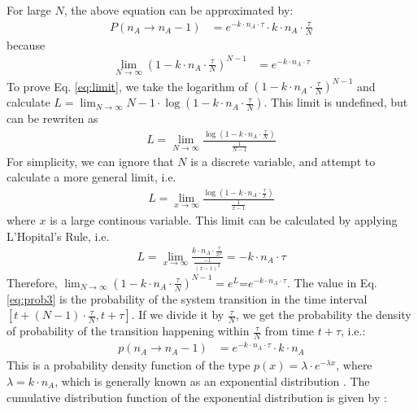 \documentclass[12pt]{article}
\begin{document}
For large $N$, the above equation can be approximated by:
\begin{align}
P(n_A \rightarrow n_A-1) &= e^{-k \cdot n_A \cdot \tau} \cdot k \cdot n_A \cdot \frac \tau N
\label{eq:prob3}
\end{align}
because 
\begin{align}
\lim_{N \to \infty} (1-k \cdot n_A \cdot \frac {\tau} {N})^{N-1} &= e^{-k \cdot n_A \cdot \tau}
\label{eq:limit}
\end{align}
To prove Eq. \ref{eq:limit}, we take the logarithm of $(1-k \cdot n_A \cdot \frac {\tau} {N})^{N-1}$ and calculate $L=\lim_{N \to \infty} {N-1} \cdot \log (1-k \cdot n_A \cdot \frac {\tau} {N})$. This limit is undefined, but can be rewriten as 
\begin {align}
L=\lim_{N \to \infty} \frac {\log (1-k \cdot n_A \cdot \frac {\tau} {N})} {\frac 1 {N-1}}
\end{align}
For simplicity, we can ignore that $N$ is a discrete variable, and attempt to calculate a more general limit, i.e. 
\begin {align}
L=\lim_{x \to \infty} \frac {\log (1-k \cdot n_A \cdot \frac {\tau} {x})} {\frac 1 {x-1}}
\label{eq:lim3}
\end{align}
where $x$ is a large continous variable. This limit can be calculated by applying L'Hopital's Rule, i.e.
\begin {align}
L=\lim_{x \to \infty} \frac { k \cdot n_A \cdot \frac {\tau} {x^2}} {\frac {-1} {(x-1)^2}} = -k \cdot n_A \cdot  \tau
\label{eq:lim4}
\end{align}
Therefore, $\lim_{N \to \infty} (1-k \cdot n_A \cdot \frac {\tau} {N})^{N-1} = e^L$=$e^{-k \cdot n_A \cdot \tau}$. The value in Eq. \ref{eq:prob3} is the probability of the system transition in the time interval $[t+(N-1) \cdot \frac \tau N,t+\tau]$. If we divide it by $\frac\tau N$, we get the probability the density of probability of the transition happening within $\frac \tau N$ from time $t+\tau$, i.e.:
\begin{align}
p(n_A \rightarrow n_A-1) &= e^{-k \cdot n_A \cdot \tau} \cdot k \cdot n_A  
\label{eq:prob4}
\end{align}
This is a probability density function of the type $p(x) = \lambda \cdot e^{-\lambda x}$, where $\lambda = k \cdot n_A$, which is generally known as an exponential distribution \cite{introProb2005}. The cumulative distribution function of the exponential distribution is given by \cite{introProb2005}:
\end{document}
